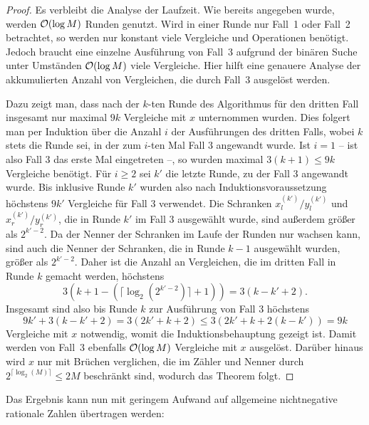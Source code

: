\begin{proof}
 	Es verbleibt die Analyse der Laufzeit.
 	Wie bereits angegeben wurde, werden $\mathcal{O}(\log M)$ Runden genutzt.
 	Wird in einer Runde nur Fall~1 oder Fall~2 betrachtet, so werden nur konstant viele Vergleiche und Operationen benötigt.
 	Jedoch braucht eine einzelne Ausführung von Fall~3 aufgrund der binären Suche unter Umständen $\mathcal{O}(\log M)$ viele Vergleiche.
 	Hier hilft eine genauere Analyse der akkumulierten Anzahl von Vergleichen, die durch Fall~3 ausgelöst werden.
 	
 	Dazu zeigt man, dass nach der $k$-ten Runde des Algorithmus für den dritten Fall insgesamt nur maximal $9k$ Vergleiche mit $x$ unternommen wurden.
 	Dies folgert man per Induktion über die Anzahl $i$ der Ausführungen des dritten Falls, wobei $k$ stets die Runde sei, in der zum $i$-ten Mal Fall $3$ angewandt wurde.
 	Ist $i=1$ -- ist also Fall 3 das erste Mal eingetreten --, so wurden maximal $3(k+1) \leq 9k$ Vergleiche benötigt.
 	Für $i\geq2$ sei $k'$ die letzte Runde, zu der Fall 3 angewandt wurde.
 	Bis inklusive Runde $k'$ wurden also nach Induktionsvoraussetzung höchstens $9k'$ Vergleiche für Fall $3$ verwendet.
 	Die Schranken $x_l^{(k')} / y_l^{(k')}$ und $x_r^{(k')} / y_r^{(k')}$, die in Runde $k'$ im Fall $3$ ausgewählt wurde, sind außerdem größer als $2^{k'-2}$.
 	Da der Nenner der Schranken im Laufe der Runden nur wachsen kann, sind auch die Nenner der Schranken, die in Runde $k-1$ ausgewählt wurden, größer als $2^{k' - 2}$.
 	Daher ist die Anzahl an Vergleichen, die im dritten Fall in Runde $k$ gemacht werden, höchstens \[
 	3(k+1-(\lceil \log_2(2^{k' - 2})\rceil + 1) )= 3(k - k' + 2).
 	\]
 	Insgesamt sind also bis Runde $k$ zur Ausführung von Fall 3 höchstens \[
 	9k' + 3(k-k'+2) = 3(2k' + k + 2) \leq 3(2k' + k + 2(k-k')) = 9 k
 	\]
 	Vergleiche mit $x$ notwendig, womit die Induktionsbehauptung gezeigt ist.
 	Damit werden von Fall~3 ebenfalls $\mathcal{O}(\log M)$ Vergleiche mit $x$ ausgelöst.
 	Darüber hinaus wird $x$ nur mit Brüchen verglichen, die im Zähler und Nenner durch $2^{\lceil \log_2(M) \rceil}\leq 2M$ beschränkt sind, wodurch das Theorem folgt.
 \end{proof}

Das Ergebnis kann nun mit geringem Aufwand auf allgemeine nichtnegative rationale Zahlen übertragen werden:

